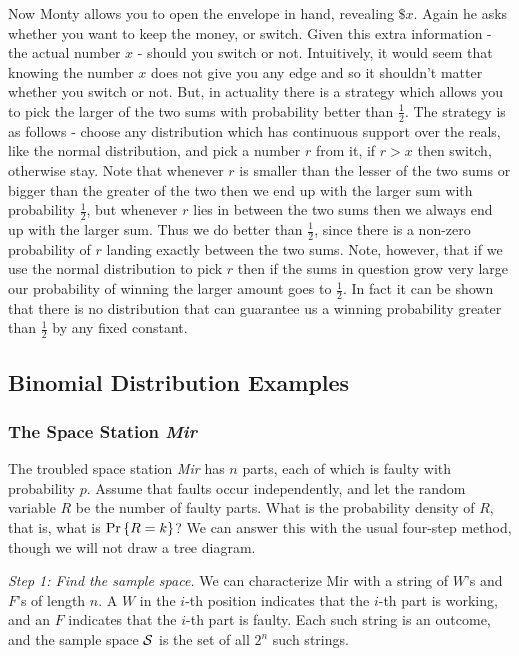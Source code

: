 \documentclass[11pt,twoside]{article}
\begin{document}
Now Monty allows you to open the envelope in hand, revealing $\$x.$
Again he asks whether you want to keep the money, or switch. Given
this extra information - the actual number $x$ - should you switch or
not. Intuitively, it would seem that knowing the number $x$ does not
give you any edge and so it shouldn't matter whether you switch or
not. But, in actuality there is a strategy which allows you to pick
the larger of the two sums with probability better than $\frac12$. The
strategy is as follows - choose any distribution which has continuous
support over the reals, like the normal distribution, and pick a
number $r$ from it, if $r > x$ then switch, otherwise stay. Note that
whenever $r$ is smaller than the lesser of the two sums or bigger than
the greater of the two then we end up with the larger sum with
probability $\frac12$, but whenever $r$ lies in between the two sums
then we always end up with the larger sum. Thus we do better than
$\frac12$, since there is a non-zero probability of $r$ landing
exactly between the two sums. Note, however, that if we use the normal
distribution to pick $r$ then if the sums in question grow very large
our probability of winning the larger amount goes to $\frac12$. In
fact it can be shown that there is no distribution that can guarantee
us a winning probability greater than $\frac12$ by any fixed constant.
\fi



\subsection{Binomial Distribution Examples}

\subsubsection{The Space Station \emph{Mir}}

The troubled space station \emph{Mir} has $n$ parts, each of which is
faulty with probability $p$.  Assume that faults occur independently, and
let the random variable $R$ be the number of faulty parts.  What is the
probability density of $R$, that is, what is $\mathop{\textup{Pr}}\nolimits\left\{R = k\right\}$?  We can answer
this with the usual four-step method, though we will not draw a tree
diagram.

\emph{Step 1: Find the sample space. } We can characterize Mir with a
string of $W$'s and $F$'s of length $n$.  A $W$ in the $i$-th position
indicates that the $i$-th part is working, and an $F$ indicates that
the $i$-th part is faulty.  Each such string is an outcome, and the
sample space $\mathcal{S}$ is the set of all $2^n$ such strings.
\end{document}
